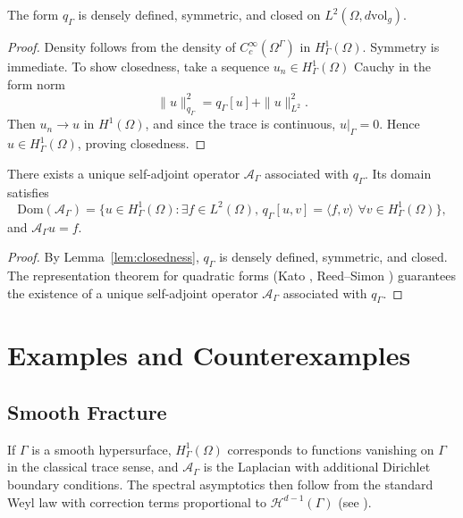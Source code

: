 \begin{lemma}
\label{lem:closedness}
The form $q_\Gamma$ is densely defined, symmetric, and closed on
$L^2(\Omega,d\mathrm{vol}_g)$.
\end{lemma}

\begin{proof}
Density follows from the density of $C_c^\infty(\Omega^\Gamma)$ in
$H^1_\Gamma(\Omega)$. Symmetry is immediate. To show closedness, take a
sequence $u_n \in H^1_\Gamma(\Omega)$ Cauchy in the form norm
\[
\|u\|_{q_\Gamma}^2 = q_\Gamma[u] + \|u\|_{L^2}^2.
\]
Then $u_n \to u$ in $H^1(\Omega)$, and since the trace is continuous,
$u|_\Gamma = 0$. Hence $u \in H^1_\Gamma(\Omega)$, proving closedness.
\end{proof}

\begin{theorem}
\label{thm:selfadjoint}
There exists a unique self-adjoint operator $\mathcal{A}_\Gamma$ associated
with $q_\Gamma$. Its domain satisfies
\[
\mathrm{Dom}(\mathcal{A}_\Gamma) = \{ u \in H^1_\Gamma(\Omega) : \exists f \in L^2(\Omega), \,
q_\Gamma[u,v] = \langle f,v \rangle \,\, \forall v \in H^1_\Gamma(\Omega) \},
\]
and $\mathcal{A}_\Gamma u = f$.
\end{theorem}

\begin{proof}
By Lemma~\ref{lem:closedness}, $q_\Gamma$ is densely defined, symmetric, and
closed. The representation theorem for quadratic forms (Kato \cite{Kato1966},
Reed--Simon \cite{ReedSimon1975}) guarantees the existence of a unique
self-adjoint operator $\mathcal{A}_\Gamma$ associated with $q_\Gamma$.
\end{proof}

\section{Examples and Counterexamples}
\subsection{Smooth Fracture}
If $\Gamma$ is a smooth hypersurface, $H^1_\Gamma(\Omega)$ corresponds to
functions vanishing on $\Gamma$ in the classical trace sense, and
$\mathcal{A}_\Gamma$ is the Laplacian with additional Dirichlet boundary
conditions. The spectral asymptotics then follow from the standard Weyl law
with correction terms proportional to $\mathcal{H}^{d-1}(\Gamma)$
(see \cite{Ivrii1998}).

